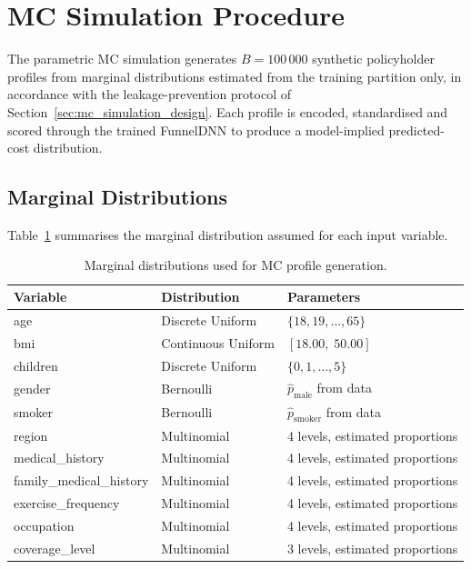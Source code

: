 \section{MC Simulation Procedure}
\label{annexure:mc_simulation}

The parametric MC simulation generates $B = 100\,000$ synthetic policyholder profiles from marginal distributions estimated from the training partition only, in accordance with the leakage-prevention protocol of Section~\ref{sec:mc_simulation_design}. Each profile is encoded, standardised and scored through the trained FunnelDNN to produce a model-implied predicted-cost distribution.

\subsection{Marginal Distributions}
\label{annexure:mc_marginals}

Table~\ref{tab:mc_marginals} summarises the marginal distribution assumed for each input variable.

\begin{table}[htbp]
\centering
\begin{tabular}{lll}
\toprule
\textbf{Variable} & \textbf{Distribution} & \textbf{Parameters} \\
\midrule
age       & Discrete Uniform  & $\{18, 19, \ldots, 65\}$ \\
bmi       & Continuous Uniform & $[18.00,\; 50.00]$ \\
children  & Discrete Uniform  & $\{0, 1, \ldots, 5\}$ \\
gender    & Bernoulli          & $\hat{p}_{\mathrm{male}}$ from data \\
smoker    & Bernoulli          & $\hat{p}_{\mathrm{smoker}}$ from data \\
region    & Multinomial        & 4 levels, estimated proportions \\
medical\_history        & Multinomial & 4 levels, estimated proportions \\
family\_medical\_history & Multinomial & 4 levels, estimated proportions \\
exercise\_frequency     & Multinomial & 4 levels, estimated proportions \\
occupation              & Multinomial & 4 levels, estimated proportions \\
coverage\_level         & Multinomial & 3 levels, estimated proportions \\
\bottomrule
\end{tabular}
\caption{Marginal distributions used for MC profile generation.}
\label{tab:mc_marginals}
\end{table}

